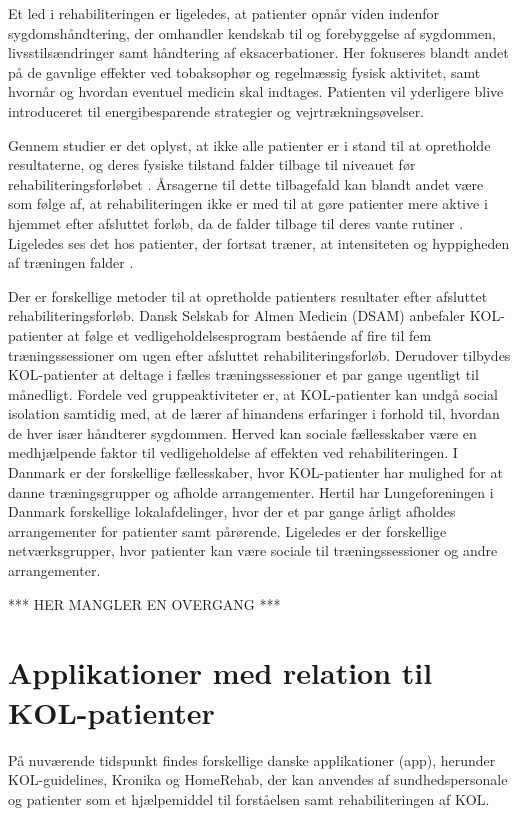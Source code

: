 Et led i rehabiliteringen er ligeledes, at patienter opnår viden indenfor sygdomshåndtering, der omhandler kendskab til og forebyggelse af sygdommen, livsstilsændringer samt håndtering af eksacerbationer.\cite{McCarthy2015,Sundhedsstyrelsen2015} Her fokuseres blandt andet på de gavnlige effekter ved tobaksophør og regelmæssig fysisk aktivitet, samt hvornår og hvordan eventuel medicin skal indtages. Patienten vil yderligere blive introduceret til energibesparende strategier og vejrtrækningsøvelser.\cite{McCarthy2015,Sundhedsstyrelsen2015}    

Gennem studier er det oplyst, at ikke alle patienter er i stand til at opretholde resultaterne, og deres fysiske tilstand falder tilbage til niveauet før rehabiliteringsforløbet \cite{Egan2012,Beachamp2013,Zanaboni2017,Ringbaek2008}. 
Årsagerne til dette tilbagefald kan blandt andet være som følge af, at rehabiliteringen ikke er med til at gøre patienter mere aktive i hjemmet efter afsluttet forløb, da de falder tilbage til deres vante rutiner \cite{Egan2012}. Ligeledes ses det hos patienter, der fortsat træner, at intensiteten og hyppigheden af træningen falder \cite{Ringbaek2008}. 

Der er forskellige metoder til at opretholde patienters resultater efter afsluttet rehabiliteringsforløb. Dansk Selskab for Almen Medicin (DSAM) anbefaler KOL-patienter at følge et vedligeholdelsesprogram bestående af fire til fem træningssessioner om ugen efter afsluttet rehabiliteringsforløb. Derudover tilbydes  KOL-patienter at deltage i fælles træningssessioner et par gange ugentligt til månedligt.\cite{dsam2016}
Fordele ved gruppeaktiviteter er, at KOL-patienter kan undgå social isolation samtidig med, at de lærer af hinandens erfaringer i forhold til, hvordan de hver især håndterer sygdommen. Herved kan sociale fællesskaber være en medhjælpende faktor til vedligeholdelse af effekten ved rehabiliteringen.\cite{dsam2016} I Danmark er der forskellige fællesskaber, hvor KOL-patienter har mulighed for at danne træningsgrupper og afholde arrangementer.\cite{Sundhedsstyrelsen2015} Hertil har Lungeforeningen i Danmark forskellige lokalafdelinger, hvor der et par gange årligt afholdes arrangementer for patienter samt pårørende. Ligeledes er der forskellige netværksgrupper, hvor patienter kan være sociale til træningssessioner og andre arrangementer.\cite{Lungeforeningen2016}

*** HER MANGLER EN OVERGANG ***

\section{Applikationer med relation til KOL-patienter}
På nuværende tidspunkt findes forskellige danske applikationer (app), herunder KOL-guidelines, Kronika og HomeRehab, der kan anvendes af  sundhedspersonale og patienter som et hjælpemiddel til forståelsen samt rehabiliteringen af KOL.\cite{KOLguidelines,kronika} 

